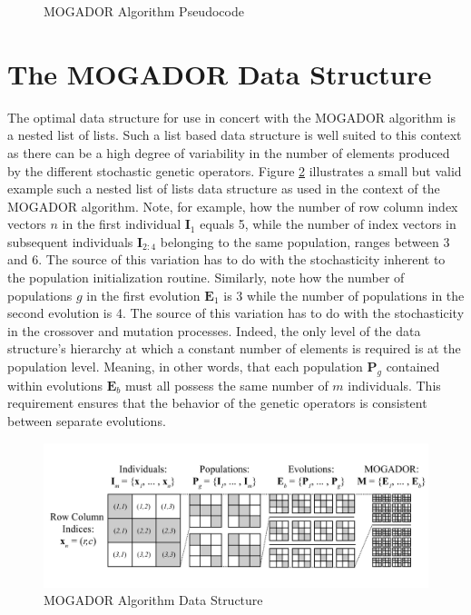             \begin{figure}[!h]
            \caption[MOGADOR Algorithm Pseudocode]{MOGADOR Algorithm Pseudocode}
            \label{fig:mogador-pseudocode}
            \end{figure}
    
\section{The MOGADOR Data Structure}
    
The optimal data structure for use in concert with the MOGADOR algorithm is a nested list of lists. Such a list based data structure is well suited to this context as there can be a high degree of variability in the number of elements produced by the different stochastic genetic operators. Figure \ref{fig:data-structure} illustrates a small but valid example such a nested list of lists data structure as used in the context of the MOGADOR algorithm. Note, for example, how the number of row column index vectors $n$ in the first individual $\textbf{I}_1$ equals 5, while the number of index vectors in subsequent individuals $\textbf{I}_{2:4}$ belonging to the same population, ranges between 3 and 6. The source of this variation has to do with the stochasticity inherent to the population initialization routine. Similarly, note how the number of populations $g$ in the first evolution $\textbf{E}_1$ is 3 while the number of populations in the second evolution is 4. The source of this variation has to do with the stochasticity in the crossover and mutation processes. Indeed, the only level of the data structure's hierarchy at which a constant number of elements is required is at the population level. Meaning, in other words, that each population $\textbf{P}_g$ contained within evolutions $\textbf{E}_b$ must all possess the same number of $m$ individuals. This requirement ensures that the behavior of the genetic operators is consistent between separate evolutions.
            
            \begin{figure}[!h]
            \centering
            \includegraphics[width=5.5in]{figures/data-structure.png}   
            \caption[MOGADOR Algorithm Data Structure]{MOGADOR Algorithm Data Structure}
            \label{fig:data-structure}
            \end{figure}

